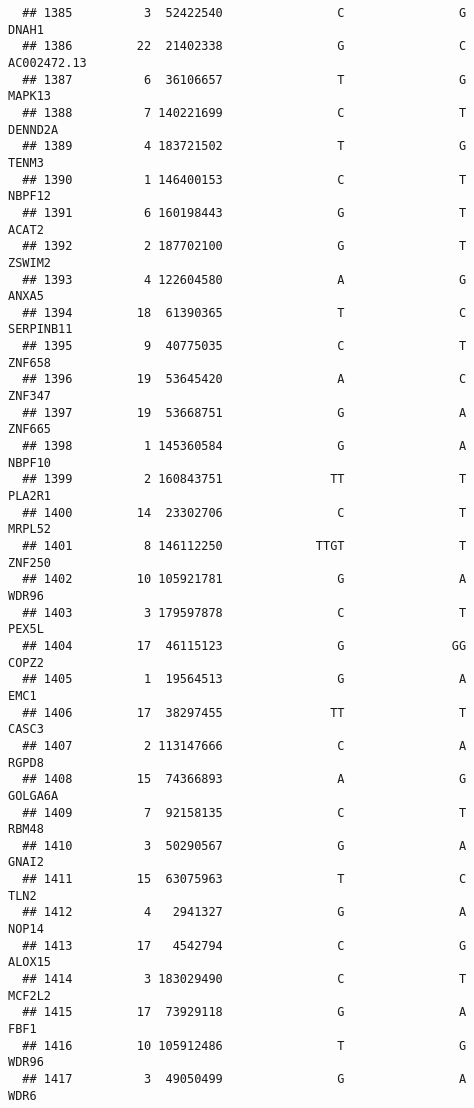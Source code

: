\documentclass[12pt,twoside]{reedthesis}
\theoremstyle{definition}
\theoremstyle{definition}
\theoremstyle{remark}
\begin{document}
\begin{verbatim}
  ## 1385          3  52422540                C                G          DNAH1
  ## 1386         22  21402338                G                C    AC002472.13
  ## 1387          6  36106657                T                G         MAPK13
  ## 1388          7 140221699                C                T        DENND2A
  ## 1389          4 183721502                T                G          TENM3
  ## 1390          1 146400153                C                T         NBPF12
  ## 1391          6 160198443                G                T          ACAT2
  ## 1392          2 187702100                G                T         ZSWIM2
  ## 1393          4 122604580                A                G          ANXA5
  ## 1394         18  61390365                T                C      SERPINB11
  ## 1395          9  40775035                C                T         ZNF658
  ## 1396         19  53645420                A                C         ZNF347
  ## 1397         19  53668751                G                A         ZNF665
  ## 1398          1 145360584                G                A         NBPF10
  ## 1399          2 160843751               TT                T         PLA2R1
  ## 1400         14  23302706                C                T         MRPL52
  ## 1401          8 146112250             TTGT                T         ZNF250
  ## 1402         10 105921781                G                A          WDR96
  ## 1403          3 179597878                C                T          PEX5L
  ## 1404         17  46115123                G               GG          COPZ2
  ## 1405          1  19564513                G                A           EMC1
  ## 1406         17  38297455               TT                T          CASC3
  ## 1407          2 113147666                C                A          RGPD8
  ## 1408         15  74366893                A                G        GOLGA6A
  ## 1409          7  92158135                C                T          RBM48
  ## 1410          3  50290567                G                A          GNAI2
  ## 1411         15  63075963                T                C           TLN2
  ## 1412          4   2941327                G                A          NOP14
  ## 1413         17   4542794                C                G         ALOX15
  ## 1414          3 183029490                C                T         MCF2L2
  ## 1415         17  73929118                G                A           FBF1
  ## 1416         10 105912486                T                G          WDR96
  ## 1417          3  49050499                G                A           WDR6

\end{verbatim}
\end{document}

